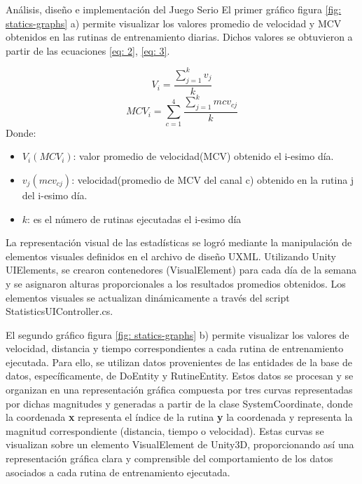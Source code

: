 \begin{thesischapter}{2} {Análisis, diseño e implementación del Juego Serio}
    El primer gráfico figura \ref{fig: statics-graphs} a) permite visualizar los valores promedio de velocidad y MCV
    obtenidos en las rutinas de entrenamiento diarias. Dichos valores se obtuvieron a partir de las ecuaciones \ref{eq: 2}, \ref{eq: 3}.    
    
     \begin{equation}
        V_{i} = \frac{\sum_{j=1}^{k} v_{j}}{k}
        \label{eq: 2}
     \end{equation}
     \begin{equation}
        MCV_{i} = \sum_{c=1}^{4}\frac{\sum_{j=1}^{k} mcv_{c j}}{k}
        \label{eq: 3}
    \end{equation}
    Donde:
    \begin{itemize}
        \item $V_{i} (MCV_{i})$: valor promedio de velocidad(MCV) obtenido el i-esimo día.
        \item $v_{j}(mcv_{cj})$: velocidad(promedio de MCV del canal c) obtenido en la rutina j del i-esimo día. 
        \item $k$: es el número de rutinas ejecutadas el i-esimo día 
    \end{itemize}
    La representación visual de las estadísticas se logró mediante la manipulación de elementos visuales definidos en el archivo de diseño UXML. Utilizando Unity 
    UIElements, se crearon contenedores (VisualElement) para cada día de la semana y se asignaron alturas proporcionales a los resultados promedios obtenidos. Los 
    elementos visuales se actualizan dinámicamente a través del script StatisticsUIController.cs.

    El segundo gráfico figura \ref{fig: statics-graphs} b) permite visualizar los valores de velocidad, distancia y tiempo 
    correspondientes a cada rutina de entrenamiento ejecutada. Para ello, se utilizan datos provenientes de las entidades 
    de la base de datos, específicamente, de DoEntity y RutineEntity. Estos datos se procesan y se organizan 
    en una representación gráfica compuesta por tres curvas representadas por dichas magnitudes y generadas a partir de la clase 
    SystemCoordinate, donde la coordenada \textbf{x} representa el índice de la rutina \textbf{y} la coordenada y representa la magnitud correspondiente (distancia, tiempo o velocidad). Estas curvas 
    se visualizan sobre un elemento VisualElement de Unity3D, proporcionando así una representación gráfica clara y comprensible del 
    comportamiento de los datos asociados a cada rutina de entrenamiento ejecutada.
    


\end{thesischapter}
